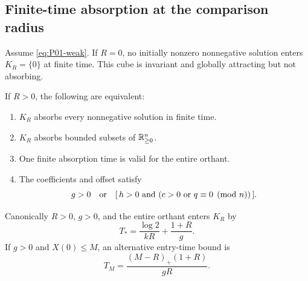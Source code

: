 \subsection{Finite-time absorption at the comparison radius}
\label{slot:P01-3}

\begin{theorem}
\label{thm:P01-absorption}
Assume \eqref{eq:P01-weak}. If $R=0$, no initially nonzero nonnegative
solution enters $K_R=\{0\}$ at finite time. This cube is invariant and
globally attracting but not absorbing.

If $R>0$, the following are equivalent:
\begin{enumerate}[label=(\roman*),leftmargin=*]
\item $K_R$ absorbs every nonnegative solution in finite time.
\item $K_R$ absorbs bounded subsets of $\mathbb{R}_{\geq 0}^{n}$.
\item One finite absorption time is valid for the entire orthant.
\item The coefficients and offset satisfy
\begin{equation}
\label{eq:P01-absorption-criterion}
 g>0\quad\hbox{or}\quad
 [\,h>0\ \hbox{and}\ (c>0\ \hbox{or}\ q\equiv0\pmod n)\,].
\end{equation}
\end{enumerate}
Canonically $R>0$, $g>0$, and the entire orthant enters $K_R$ by
\begin{equation}
\label{eq:P01-canonical-time}
 T_*=\frac{\log2}{kR}+\frac{1+R}{g}.
\end{equation}
If $g>0$ and $X(0)\le M$, an alternative entry-time bound is
\begin{equation}
\label{eq:P01-bounded-time}
 T_M=\frac{(M-R)_+(1+R)}{gR}.
\end{equation}
\end{theorem}
